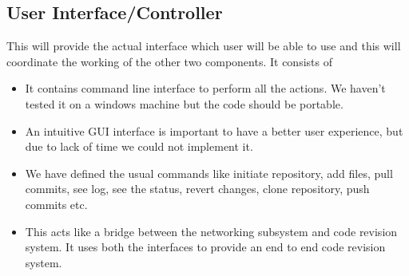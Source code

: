 \documentclass[12pt]{article}
\begin{document}
\subsection{User Interface/Controller}
This will provide the actual interface which user will be able to use and this
will coordinate the working of the other two components.
It consists of
\begin{itemize}
\item It contains command line interface to perform all the actions. We
  haven't tested it on a windows machine but the code should be portable.
\item An intuitive GUI interface is important to have a better user
  experience, but due to lack of time we could not implement it.
\item We have defined the usual commands like initiate repository, add files,
  pull commits, see log, see the status, revert changes, clone repository,
  push commits etc.
\item This acts like a bridge between the networking subsystem and code
  revision system. It uses both the interfaces to provide an end to end code
  revision system.
\end{itemize}
\end{document}
